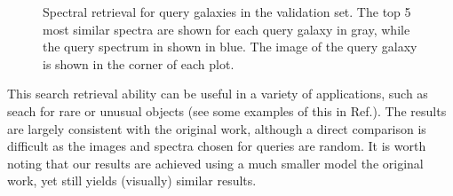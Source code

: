 \documentclass[a4paper,12pt]{article}
\begin{document}
\begin{figure}[H]

    \caption{Spectral retrieval for query galaxies in the validation set. The top 5 most similar spectra are shown for each query galaxy in gray, while the query spectrum in shown in blue. The image of the query galaxy is shown in the corner of each plot.
    }
    \label{fig:spectral_retrieval}
\end{figure}

This search retrieval ability can be useful in a variety of applications, such as seach for rare or unusual objects (see some examples of this in Ref.\cite{stein}). The results are largely consistent with the original work, although a direct comparison is difficult as the images and spectra chosen for queries are random. It is worth noting that our results are achieved using a much smaller model the original work, yet still yields (visually) similar results.


\end{document}
